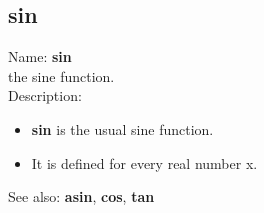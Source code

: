 \subsection{ sin }
\noindent Name: \textbf{sin}\\
the sine function.\\

\noindent Description: \begin{itemize}

\item \textbf{sin} is the usual sine function.

\item It is defined for every real number x.
\end{itemize}
See also: \textbf{asin}, \textbf{cos}, \textbf{tan}
